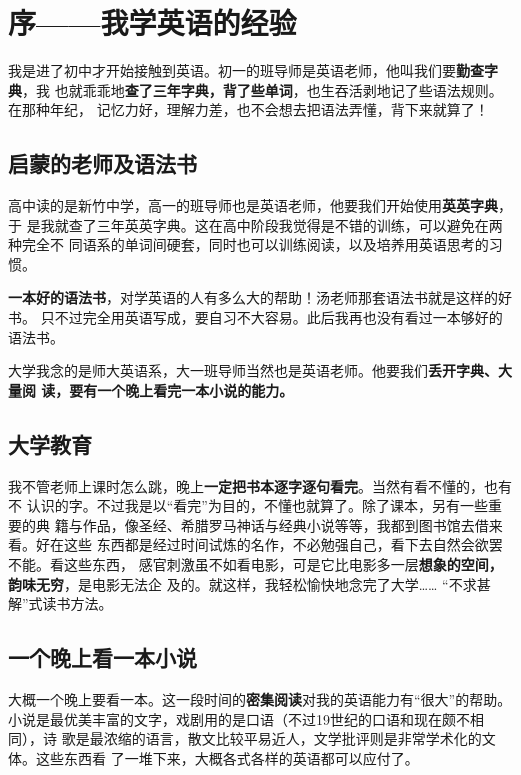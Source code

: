 \chapter{序——我学英语的经验}

我是进了初中才开始接触到英语。初一的班导师是英语老师，他叫我们要\textbf{勤查字典}，我
也就乖乖地\textbf{查了三年字典，背了些单词}，也生吞活剥地记了些语法规则。在那种年纪，
记忆力好，理解力差，也不会想去把语法弄懂，背下来就算了！

\section*{启蒙的老师及语法书}

高中读的是新竹中学，高一的班导师也是英语老师，他要我们开始使用\textbf{英英字典}，于
是我就查了三年英英字典。这在高中阶段我觉得是不错的训练，可以避免在两种完全不
同语系的单词间硬套，同时也可以训练阅读，以及培养用英语思考的习惯。

\textbf{一本好的语法书}，对学英语的人有多么大的帮助！汤老师那套语法书就是这样的好书。
只不过完全用英语写成，要自习不大容易。此后我再也没有看过一本够好的语法书。

大学我念的是师大英语系，大一班导师当然也是英语老师。他要我们\textbf{丢开字典、大量阅
  读，要有一个晚上看完一本小说的能力。}

\section*{大学教育}

我不管老师上课时怎么跳，晚上\textbf{一定把书本逐字逐句看完}。当然有看不懂的，也有不
认识的字。不过我是以“看完”为目的，不懂也就算了。除了课本，另有一些重要的典
籍与作品，像圣经、希腊罗马神话与经典小说等等，我都到图书馆去借来看。好在这些
东西都是经过时间试炼的名作，不必勉强自己，看下去自然会欲罢不能。看这些东西，
感官刺激虽不如看电影，可是它比电影多一层\textbf{想象的空间，韵味无穷}，是电影无法企
及的。就这样，我轻松愉快地念完了大学…… “不求甚解”式读书方法。

\section*{一个晚上看一本小说}

大概一个晚上要看一本。这一段时间的\textbf{密集阅读}对我的英语能力有“很大”的帮助。
小说是最优美丰富的文字，戏剧用的是口语（不过19世纪的口语和现在颇不相同），诗
歌是最浓缩的语言，散文比较平易近人，文学批评则是非常学术化的文体。这些东西看
了一堆下来，大概各式各样的英语都可以应付了。

